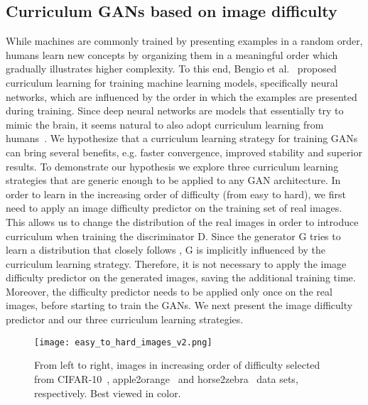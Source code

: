 \documentclass[10pt,twocolumn,letterpaper]{article}
\begin{document}
\vspace{-0.1cm}
\subsection{Curriculum GANs based on image difficulty}
\label{sec_Method_sub}
\vspace{-0.1cm}

While machines are commonly trained by presenting examples in a random order, humans learn new concepts by organizing them in a meaningful order which gradually illustrates higher complexity. To this end, Bengio et al.~\cite{Bengio-ICML-2009} proposed curriculum learning for training machine learning models, specifically neural networks, which are influenced by the order in which the examples are presented during training. Since deep neural networks are models that essentially try to mimic the brain, it seems natural to also adopt curriculum learning from humans~\cite{Smith-TCS-2018}. We hypothesize that a curriculum learning strategy for training GANs can bring several benefits, e.g. faster convergence, improved stability and superior results. To demonstrate our hypothesis we explore three curriculum learning strategies that are generic enough to be applied to any GAN architecture. In order to learn in the increasing order of difficulty (from easy to hard), we first need to apply an image difficulty predictor on the training set of real images. This allows us to change the distribution of the real images  in order to introduce curriculum when training the discriminator D. Since the generator G tries to learn a distribution  that closely follows , G is implicitly influenced by the curriculum learning strategy. Therefore, it is not necessary to apply the image difficulty predictor on the generated images, saving the additional training time. Moreover, the difficulty predictor needs to be applied only once on the real images, before starting to train the GANs. We next present the image difficulty predictor and our three curriculum learning strategies.

\begin{figure}[!t]
\begin{center}
\texttt{[image: easy\_to\_hard\_images\_v2.png]}
\end{center}
\vspace*{-0.3cm}
\caption{From left to right, images in increasing order of difficulty selected from CIFAR-10~\cite{Krizhevsky-TR-2009}, apple2orange~\cite{Zhu-ICCV-2017} and horse2zebra~\cite{Zhu-ICCV-2017} data sets, respectively. Best viewed in color.}
\label{fig_easy_to_hard}
\vspace*{-0.4cm}
\end{figure}
\end{document}
